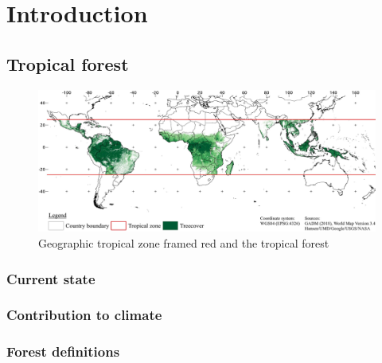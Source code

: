 \section{Introduction}
\label{sec:introduction}

\subsection{Tropical forest}
	\begin{figure}[ht]
		\centering
		\includegraphics[scale=0.97]{img/intro_overview_frameless}
		\caption[Tropical zone]{Geographic tropical zone framed red and the tropical forest}
		\label{fig:tropicalzone}
	\end{figure}

	\subsubsection{Current state}
	\subsubsection{Contribution to climate}
	\subsubsection{Forest definitions}

